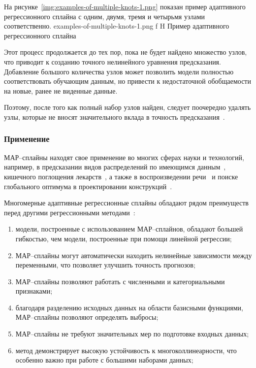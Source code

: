 На рисунке~\ref{img:examples-of-multiple-knots-1.png} показан пример адаптивного регрессионного сплайна с одним, двумя, тремя и четырьмя узлами соответственно.
{examples-of-multiple-knots-1.png}
{f}
{H}
{\textwidth}
{Пример адаптивного регрессионного сплайна}

Этот процесс продолжается до тех пор, пока не будет найдено множество узлов, что приводит к созданию точного нелинейного уравнения предсказания.
Добавление большого количества узлов может позволить модели полностью соответствовать обучающим данным, но привести к недостаточной обобщаемости на новые, ранее не виденные данные.

Поэтому, после того как полный набор узлов найден, следует поочередно удалять узлы, которые не вносят значительного вклада в точность предсказания~\cite{gitbook}.

\subsubsection*{Применение}

МАР--сплайны находят свое применение во многих сферах науки и технологий, например, в предсказании видов распределений по имеющимся данным~\cite{elith2007}, кишечного поглощения лекарств~\cite{deconinck2007}, а также в воспроизведении речи~\cite{haas1998} и поиске глобального оптимума в проектировании конструкций~\cite{crino2007}.

Многомерные адаптивные регрессионные сплайны обладают рядом преимуществ перед другими регрессионными методами~\cite{fedosin}:
\begin{enumerate}[label=\arabic*), leftmargin=1.6\parindent]
    \item модели, построенные с использованием МАР--сплайнов, обладают большей гибкостью, чем модели, построенные при помощи линейной регрессии;
    \item МАР--сплайны могут автоматически находить нелинейные зависимости между переменными, что позволяет улучшить точность прогнозов;
    \item МАР--сплайны позволяют работать с численными и категориальными признаками;
    \item благодаря разделению исходных данных на области базисными функциями, МАР--сплайны позволяют определять выбросы;
    \item МАР--сплайны не требуют значительных мер по подготовке входных данных;
    \item метод демонстрирует высокую устойчивость к многоколлинеарности, что особенно важно при работе с большими наборами данных;
\end{enumerate}

